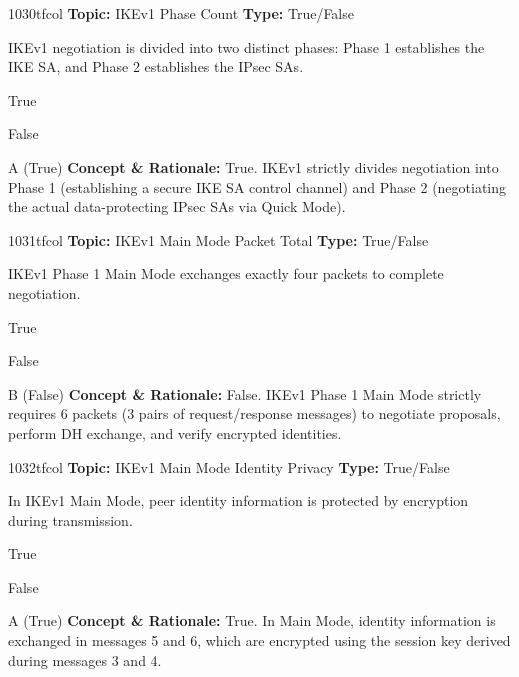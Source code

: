 \begin{qcard}{1030}{tfcol}
\textcolor{darkslate!75}{\small\textbf{Topic:} IKEv1 Phase Count \hfill \textbf{Type:} True/False}\vspace{0.4em}\par
IKEv1 negotiation is divided into two distinct phases: Phase 1 establishes the IKE SA, and Phase 2 establishes the IPsec SAs.
\begin{qoptions}
\item True
\item False
\end{qoptions}
\end{qcard}
\nopagebreak
\begin{explainbox}{A (True)}
\textbf{Concept \& Rationale:} True. IKEv1 strictly divides negotiation into Phase 1 (establishing a secure IKE SA control channel) and Phase 2 (negotiating the actual data-protecting IPsec SAs via Quick Mode).
\end{explainbox}

\begin{qcard}{1031}{tfcol}
\textcolor{darkslate!75}{\small\textbf{Topic:} IKEv1 Main Mode Packet Total \hfill \textbf{Type:} True/False}\vspace{0.4em}\par
IKEv1 Phase 1 Main Mode exchanges exactly four packets to complete negotiation.
\begin{qoptions}
\item True
\item False
\end{qoptions}
\end{qcard}
\nopagebreak
\begin{explainbox}{B (False)}
\textbf{Concept \& Rationale:} False. IKEv1 Phase 1 Main Mode strictly requires 6 packets (3 pairs of request/response messages) to negotiate proposals, perform DH exchange, and verify encrypted identities.
\end{explainbox}

\begin{qcard}{1032}{tfcol}
\textcolor{darkslate!75}{\small\textbf{Topic:} IKEv1 Main Mode Identity Privacy \hfill \textbf{Type:} True/False}\vspace{0.4em}\par
In IKEv1 Main Mode, peer identity information is protected by encryption during transmission.
\begin{qoptions}
\item True
\item False
\end{qoptions}
\end{qcard}
\nopagebreak
\begin{explainbox}{A (True)}
\textbf{Concept \& Rationale:} True. In Main Mode, identity information is exchanged in messages 5 and 6, which are encrypted using the session key derived during messages 3 and 4.
\end{explainbox}

